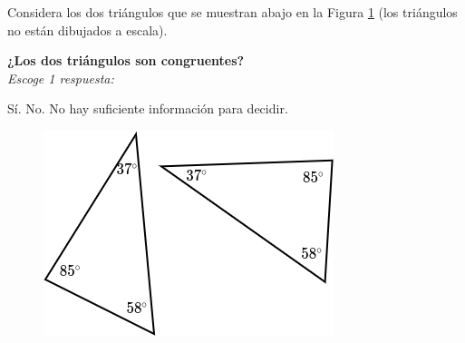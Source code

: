 Considera los dos triángulos que se muestran abajo en la Figura \ref{fig:20230323152030} (los triángulos no están dibujados a escala).

\begin{minipage}{0.6\textwidth}
    \textbf{¿Los dos triángulos son congruentes?}\\
    \emph{Escoge 1 respuesta:}\\

    \begin{choices}
        \choice Sí.
        \choice No.
        \CorrectChoice No hay suficiente información para decidir.
    \end{choices}
\end{minipage}%
\begin{minipage}{0.35\textwidth}
    \begin{figure}[H]
        \includegraphics[width=0.8\linewidth]{../images/20230323152030}
        \caption{}
        \label{fig:20230323152030}
    \end{figure}
\end{minipage}

